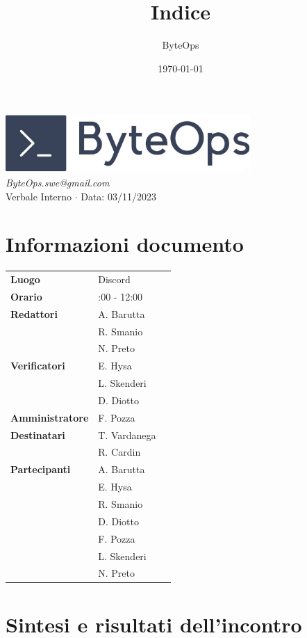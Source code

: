 \documentclass{article}
\title{\textbf{\fontsize{30}{6}\selectfont Indice}}
\author{\fontsize{14}{6}\selectfont ByteOps}
\date{\today}
\begin{document}
\pagestyle{fancy}
\begin{center}
\includegraphics[width = 0.7\textwidth]{../../../Images/logo.png} \\
\vspace{0.2cm}
\textcolor[RGB]{60, 60, 60}{\textit{ByteOps.swe@gmail.com}} \\
\vspace{1cm}
\fontsize{16}{6}\selectfont Verbale Interno $\cdot$ Data: 03/11/2023 \\
\vspace{0.5cm}
\end{center}

\section*{Informazioni documento}
\def\arraystretch{1.2}
\begin{tabular}{>{\raggedleft\arraybackslash}p{}|>{\raggedright\arraybackslash}p{}c}
\hline
\addlinespace
    \textbf{Luogo} & Discord \vspace{10pt} \\
    \textbf{Orario} & 10:00 - 12:00 \vspace{10pt} \\
    \textbf{Redattori} & A. Barutta \\ & R. Smanio \\ & N. Preto \vspace{10pt} \\
    \textbf{Verificatori} & E. Hysa \\ & L. Skenderi \\ & D. Diotto \vspace{10pt} \\
    \textbf{Amministratore} & F. Pozza \vspace{10pt} \\
    \textbf{Destinatari} & T. Vardanega \\ & R. Cardin \vspace{10pt} \\
    \textbf{Partecipanti} & A. Barutta \\ & E. Hysa \\ & R. Smanio \\ & D. Diotto \\ & F. Pozza \\ & L. Skenderi \\ & N. Preto \vspace{10pt} \\
\end{tabular}
\pagebreak 


\section*{\textbf{Sintesi e risultati dell’incontro}}
\end{document}
